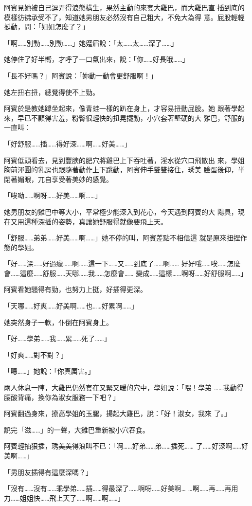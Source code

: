 阿賓見她被自己逗弄得浪態橫生，果然主動的來套大雞巴，而大雞巴直
插到底的模樣彷彿承受不了，知道她男朋友必然沒有自己粗大，不免大為得
意。屁股輕輕挺動，問：「姐姐怎麼了？」

「啊……別動……別動……」她蹙眉說：「太……太……深了……」

她停住了好半嚮，才呼了一口氣出來，說：「你……好長哦……」

「長不好嗎？」阿賓說：「妳動一動會更舒服啊！」

她左扭右扭，總覺得使不上勁。

阿賓於是教她蹲坐起來，像青蛙一樣的趴在身上，才容易扭動屁股。她
跟著學起來，早已不顧得害羞，粉臀很輕快的扭晃擺動，小穴套著堅硬的大
雞巴，舒服的一直叫：

「好舒服……插……得好深……啊……好美……」

阿賓低頭看去，見到豐腴的肥穴將雞巴上下吞吐著，淫水從穴口飛散出
來，學姐胸前渾圓的乳房也跟隨著動作上下跳動，阿賓伸手雙雙接住，琇美
臉蛋後仰，半閉著媚眼，兀自享受著美妙的感覺。

「唉呦……啊呀……好美……啊……」

她男朋友的雞巴中等大小，平常極少能深入到花心，今天遇到阿賓的大
陽具，現在又用這種深插的姿勢，真讓她舒服得就像要飛上天。

「舒服……弟弟……好美……啊……」她不停的叫，阿賓差點不相信這
就是原來扭捏作態的學姐。

「好……深……好過癮……啊……這一下……又……到底了……啊……
好好哦……唉……怎麼會……這麼……舒服……天哪……我……怎麼會……
變成……這樣……啊呀……好舒服啊……」

阿賓看她騷得有勁，也努力上挺，好插得更深。

「天哪……好爽……好美啊……也……好累啊……」

她突然身子一軟，仆倒在阿賓身上。

「好……學弟……我……累……死了……」

「好爽……對不對？」

「嗯……」她說：「你真厲害。」

兩人休息一陣，大雞巴仍然套在又緊又暖的穴中，學姐說：「喂！學弟
……我動得腰酸背痛，換你為淑女服務一下吧？」

阿賓翻過身來，撩高學姐的玉腿，揚起大雞巴，說：「好！淑女，我來
了。」

說完「滋……」的一聲，大雞巴重新被小穴吞食。

阿賓輕抽狠插，琇美美得浪叫不已：「啊……好弟……弟……插死……
了……好深啊……好美啊……」

「男朋友插得有這麼深嗎？」

「沒有……沒有……乖學弟……插……得最深了……啊呀……好美啊…
…啊……再……再用力……姐姐快……飛上天了……啊……啊……」

